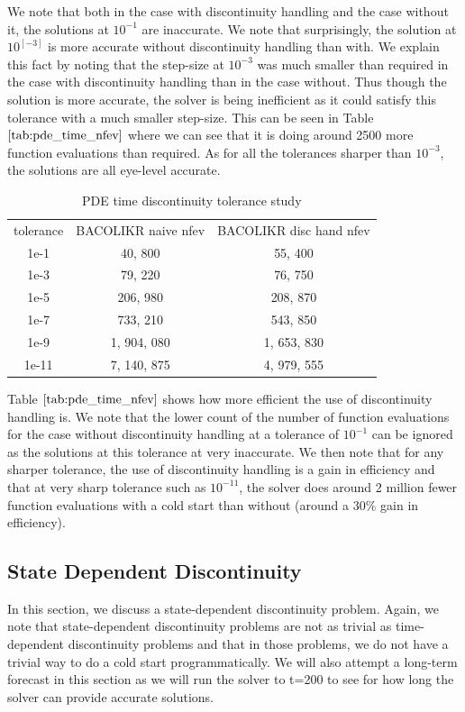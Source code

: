 \documentclass{article}
\begin{document}
We note that both in the case with discontinuity handling and the case without it, the solutions at $10^{-1}$ are inaccurate. We note that surprisingly, the solution at $10^[-3]$ is more accurate without discontinuity handling than with. We explain this fact by noting that the step-size at $10^{-3}$ was much smaller than required in the case with discontinuity handling than in the case without. Thus though the solution is more accurate, the solver is being inefficient as it could satisfy this tolerance with a much smaller step-size. This can be seen in Table $\ref{tab:pde_time_nfev}$ where we can see that it is doing around 2500 more function evaluations than required. As for all the tolerances sharper than $10^{-3}$, the solutions are all eye-level accurate.

\begin{table}[h]
\caption {PDE time discontinuity tolerance study} 
\label{tab:pde_time_nfev}
\begin{center}
\begin{tabular}{ c c c } 
tolerance & BACOLIKR naive nfev & BACOLIKR disc hand nfev \\ 
1e-1 & 40, 800 & 55, 400 \\
1e-3 & 79, 220 & 76, 750 \\
1e-5 & 206, 980 & 208, 870 \\
1e-7 & 733, 210 & 543, 850 \\
1e-9 & 1, 904, 080 & 1, 653, 830 \\
1e-11 & 7, 140, 875 & 4, 979, 555 \\
\end{tabular}
\end{center}
\end{table}

Table $\ref{tab:pde_time_nfev}$ shows how more efficient the use of discontinuity handling is. We note that the lower count of the number of function evaluations for the case without discontinuity handling at a tolerance of $10^{-1}$ can be ignored as the solutions at this tolerance at very inaccurate. We then note that for any sharper tolerance, the use of discontinuity handling is a gain in efficiency and that at very sharp tolerance such as $10^{-11}$, the solver does around 2 million fewer function evaluations with a cold start than without (around a $30\%$ gain in efficiency). 

\subsection{State Dependent Discontinuity}
\label{subsection:pde_state_intro}
In this section, we discuss a state-dependent discontinuity problem. Again, we note that state-dependent discontinuity problems are not as trivial as time-dependent discontinuity problems and that in those problems, we do not have a trivial way to do a cold start programmatically. We will also attempt a long-term forecast in this section as we will run the solver to t=200 to see for how long the solver can provide accurate solutions.
\end{document}
